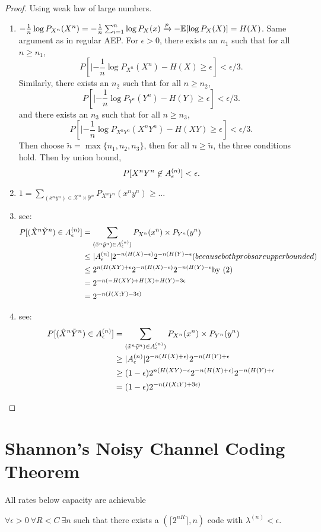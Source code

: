 \begin{proof}
Using weak law of large numbers.
\begin{enumerate}
\item $-\frac{1}{n} \log P_{X^n}(X^n) = - \frac{1}{n} \sum_{i=1}^n \log P_X(x) \xrightarrow{p} - \mathbb{E}[\log P_X(X)] = H(X)$. Same argument as in regular AEP. For $\epsilon > 0$, there exists an $n_1$ such that for all $n \geq n_1$,
\[
P[|-\frac{1}{n} \log P_{X^n}(X^n) - H(X) \geq \epsilon] < \epsilon/3.
\]
Similarly, there exists an $n_2$ such that for all $n \geq n_2$,
\[
P[|-\frac{1}{n} \log P_{Y^n}(Y^n) - H(Y) \geq \epsilon] < \epsilon/3.
\]
and there exists an $n_3$ such that for all $n \geq n_3$,
\[
P[|-\frac{1}{n} \log P_{X^nY^n}(X^nY^n) - H(XY) \geq \epsilon] < \epsilon/3.
\]
Then choose $\tilde{n} = \max\{n_1,n_2,n_3\}$, then for all $n \geq \tilde{n}$, the three conditions hold. Then by union bound,
\[
P[X^nY^n \not\in A_{\epsilon}^{(n)}] < \epsilon.
\]
\item $1 = \sum_{(x^ny^n) \in \mathcal{X}^n \times \mathcal{Y}^n} P_{X^nY^n}(x^ny^n) \geq ...$
\item see:
\begin{align*}
P[(\tilde{X}^n\tilde{Y}^n) \in A_{\epsilon}^{(n)}] &= \sum_{(\tilde{x}^n\tilde{y}^n) \in A_{\epsilon}^{(n)})} P_{X^n}(x^n) \times P_{Y^n}(y^n)\\
&\leq |A_{\epsilon}^{(n)}| 2^{-n(H(X) - \epsilon)}2^{-n(H(Y) - \epsilon} \mbox(because both probs are upper bounded)\\
&\leq 2^{n(H(XY) + \epsilon}2^{-n(H(X) - \epsilon)}2^{-n(H(Y) - \epsilon} \mbox{by (2)}\\
&= 2^{-n(-H(XY) +H(X) + H(Y) - 3\epsilon}\\
&= 2^{-n(I(X;Y) - 3\epsilon)}
\end{align*}
\item see:
\begin{align*}
P[(\tilde{X}^n\tilde{Y}^n) \in A_{\epsilon}^{(n)}] &= \sum_{(\tilde{x}^n\tilde{y}^n) \in A_{\epsilon}^{(n)})} P_{X^n}(x^n) \times P_{Y^n}(y^n)\\
&\geq |A_{\epsilon}^{(n)}| 2^{-n(H(X) + \epsilon)}2^{-n(H(Y) + \epsilon}\\
&\geq (1-\epsilon)2^{n(H(XY) - \epsilon}2^{-n(H(X) + \epsilon)}2^{-n(H(Y) + \epsilon}\\
&= (1-\epsilon)2^{-n(I(X;Y) + 3\epsilon)}
\end{align*}

\end{enumerate}
\end{proof}

\section{Shannon's Noisy Channel Coding Theorem}
All rates below capacity are achievable
\begin{theorem}
$\forall \epsilon > 0 \ \forall R < C \ \exists n$ such that there exists a $(\lceil 2^{nR}\rceil, n)$ code with $\lambda^{(n)} < \epsilon$.
\end{theorem}

